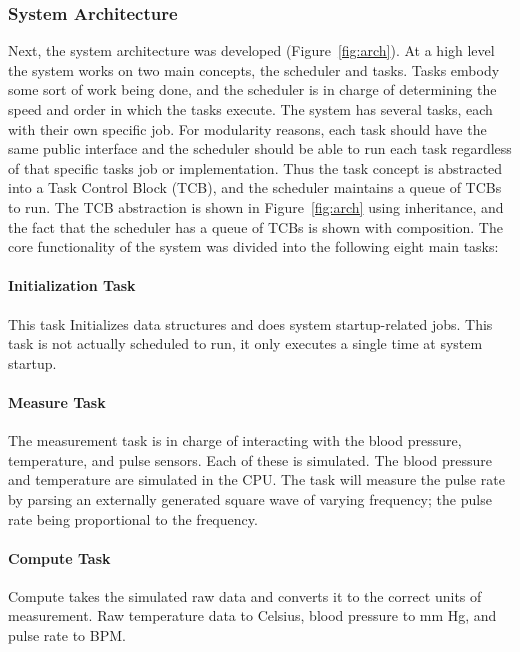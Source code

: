 \documentclass[12pt]{article} %
\begin{document}
    \subsubsection{System Architecture}
    Next, the system architecture was developed (Figure~\ref{fig:arch}). At a high
    level the system works on two main concepts, the scheduler and tasks. Tasks
    embody some sort of work being done, and the scheduler is in charge of
    determining the speed and order in which the tasks execute. The system has
    several tasks, each with their own specific job. For modularity reasons, each
    task should have the same public interface and the scheduler should be able to
    run each task regardless of that specific tasks job or implementation. Thus
    the task concept is abstracted into a Task Control Block (TCB), and the
    scheduler maintains a queue of TCBs to run. The TCB abstraction is shown in
    Figure~\ref{fig:arch} using inheritance, and the fact that the scheduler has a
    queue of TCBs is shown with composition. The core functionality of the system
    was divided into the following eight main tasks:

    \paragraph{Initialization Task} This task Initializes data structures and does
    system startup-related jobs. This task is not actually scheduled to run, it
    only executes a single time at system startup.

    \paragraph{Measure Task} The measurement task is in charge of interacting with
    the blood pressure, temperature, and pulse sensors. Each of these is
    simulated. The blood pressure and temperature are simulated in the CPU. The
    task will measure the pulse rate by parsing an externally generated square wave
    of varying frequency; the pulse rate being proportional to the frequency.

    \paragraph{Compute Task} Compute takes the simulated raw data and converts it to the
    correct units of measurement. Raw temperature data to Celsius, blood pressure
    to mm Hg, and pulse rate to BPM.
\end{document}
